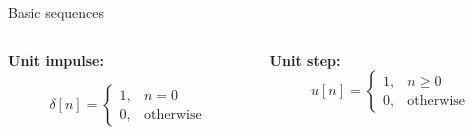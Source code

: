 \documentclass[10pt]{beamer}
\begin{document}
%
\begin{frame}{Basic sequences}
	\begin{columns}[t]
		\begin{column}{0.5\linewidth}
			\textbf{Unit impulse:} 
			
			\begin{equation*}
				\delta[n] = \begin{cases}
				1, & n = 0 \\
				0, & \text{otherwise}
				\end{cases}
			\end{equation*}
		\end{column}		
		
		\begin{column}{0.5\linewidth}
			\textbf{Unit step:} 
			\begin{equation*}
				u[n] = \begin{cases}
				1, & n \geq 0 \\
				0, & \text{otherwise}
				\end{cases}
			\end{equation*}
		\end{column}
	\end{columns}
	\vspace{0.5cm}
	\begin{columns}[t]
	\begin{column}{0.5\linewidth}		
		\centering
		\resizebox{\linewidth}{!}{}
	\end{column}		
	
	\begin{column}{0.5\linewidth}
		\centering
		\resizebox{\linewidth}{!}{}
	\end{column}
\end{columns}
\end{frame}
\end{document}
